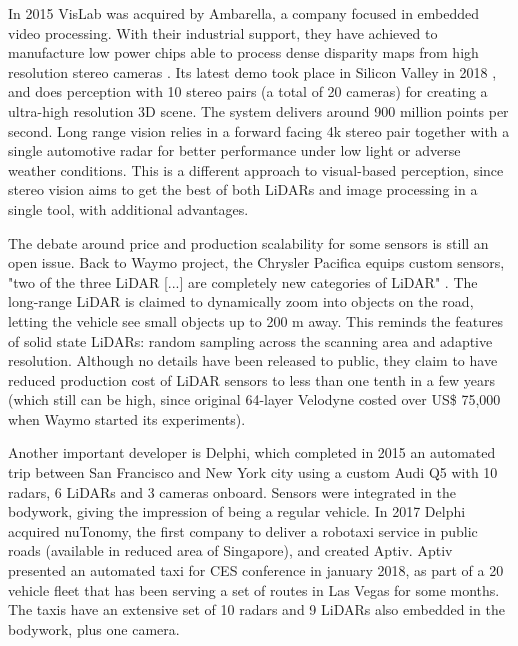 In 2015 VisLab was acquired by Ambarella, a company focused in embedded video 
processing. With their industrial support, they have achieved to manufacture 
low power chips able to process dense disparity maps from high resolution 
stereo cameras \cite{Ambarella2018}. Its latest demo took place in Silicon 
Valley in 2018 \cite{AUVSI2018}, and does perception with 10 stereo pairs (a 
total of 20 cameras) for creating a ultra-high resolution 3D scene. The system
delivers around 900 million points per second.
Long range vision relies in a forward facing 4k stereo pair together with a single automotive radar for better performance under low light or adverse weather conditions. This is a different approach to visual-based perception, since stereo vision aims to get the best of both LiDARs and image processing in a single tool, with additional advantages.

The debate around price and production scalability for some sensors is still an 
open issue. Back to Waymo project, the Chrysler Pacifica equips custom sensors, 
"two of the three LiDAR [...] are completely new categories of LiDAR" 
\cite{Waymoteam2017}. The long-range LiDAR is claimed to dynamically zoom into 
objects on the road, letting the vehicle see small objects up to 200 m away. 
This reminds the features of solid state LiDARs: random sampling across the 
scanning area and adaptive resolution. Although no details have been released 
to public, they claim to have reduced production cost of LiDAR sensors to less 
than one tenth in a few years (which still can be high, since original 64-layer 
Velodyne costed over US\$ 75,000 when Waymo started its experiments).

Another important developer is Delphi, which completed in 2015 an automated
trip between San Francisco and New York city using a custom Audi Q5 with
10 radars, 6 LiDARs and 3 cameras onboard. Sensors were integrated in the
bodywork, giving the impression of being a regular vehicle. In 2017 Delphi
acquired nuTonomy, the first company to deliver a robotaxi service 
in public roads (available in reduced area of Singapore), and created Aptiv. 
Aptiv presented an automated taxi for CES 
conference in january 2018, as part of a 20 vehicle fleet that has been 
serving a set of routes in Las Vegas for some months. The taxis have an
extensive set of 10 radars and 9 LiDARs also embedded in the bodywork, plus
one camera.
